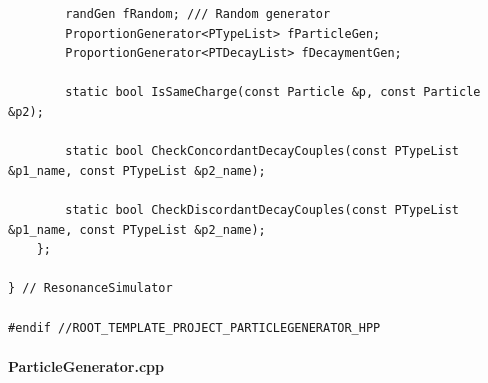 \documentclass[12pt, a4paper]{article}
\begin{document}
\begin{verbatim}
        randGen fRandom; /// Random generator
        ProportionGenerator<PTypeList> fParticleGen;
        ProportionGenerator<PTDecayList> fDecaymentGen;

        static bool IsSameCharge(const Particle &p, const Particle &p2);

        static bool CheckConcordantDecayCouples(const PTypeList &p1_name, const PTypeList &p2_name);

        static bool CheckDiscordantDecayCouples(const PTypeList &p1_name, const PTypeList &p2_name);
    };

} // ResonanceSimulator

#endif //ROOT_TEMPLATE_PROJECT_PARTICLEGENERATOR_HPP

\end{verbatim}

\paragraph{ParticleGenerator.cpp}
\end{document}

